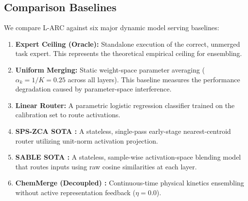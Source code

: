 \subsection{Comparison Baselines}
We compare L-ARC against six major dynamic model serving baselines:
\begin{enumerate}
    \item \textbf{Expert Ceiling (Oracle):} Standalone execution of the correct, unmerged task expert. This represents the theoretical empirical ceiling for ensembling.
    \item \textbf{Uniform Merging:} Static weight-space parameter averaging ($\alpha_k = 1/K = 0.25$ across all layers). This baseline measures the performance degradation caused by parameter-space interference.
    \item \textbf{Linear Router:} A parametric logistic regression classifier trained on the calibration set to route activations.
    \item \textbf{SPS-ZCA SOTA \cite{spszca2025}:} A stateless, single-pass early-stage nearest-centroid router utilizing unit-norm activation projection.
    \item \textbf{SABLE SOTA \cite{sable2025}:} A stateless, sample-wise activation-space blending model that routes inputs using raw cosine similarities at each layer.
    \item \textbf{ChemMerge (Decoupled) \cite{chemmerge2025}:} Continuous-time physical kinetics ensembling without active representation feedback ($\eta = 0.0$).
\end{enumerate}

